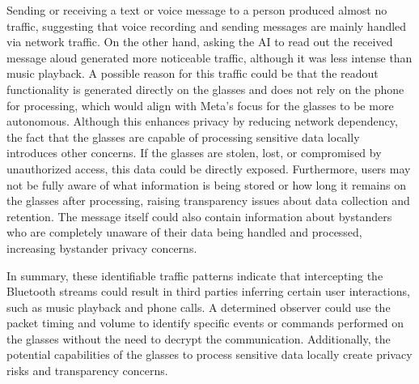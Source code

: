 Sending or receiving a text or voice message to a person produced almost no traffic, suggesting that voice recording and sending messages are mainly handled via network traffic. On the other hand, asking the AI to read out the received message aloud generated more noticeable traffic, although it was less intense than music playback. A possible reason for this traffic could be that the readout functionality is generated directly on the glasses and does not rely on the phone for processing, which would align with Meta's focus for the glasses to be more autonomous. Although this enhances privacy by reducing network dependency, the fact that the glasses are capable of processing sensitive data locally introduces other concerns. If the glasses are stolen, lost, or compromised by unauthorized access, this data could be directly exposed. Furthermore, users may not be fully aware of what information is being stored or how long it remains on the glasses after processing, raising transparency issues about data collection and retention. The message itself could also contain information about bystanders who are completely unaware of their data being handled and processed, increasing bystander privacy concerns. 

In summary, these identifiable traffic patterns indicate that intercepting the Bluetooth streams could result in third parties inferring certain user interactions, such as music playback and phone calls. A determined observer could use the packet timing and volume to identify specific events or commands performed on the glasses without the need to decrypt the communication. Additionally, the potential capabilities of the glasses to process sensitive data locally create privacy risks and transparency concerns.



